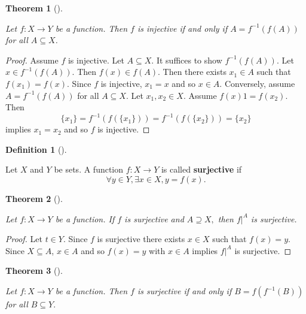 \documentclass[
  letterpaper,
  10pt,
  reqno,
  twopage,
  openany]{book}
\theoremstyle{plain}
\theoremstyle{definition}
\theoremstyle{definition}
\newtheorem{definition}{Definition}[chapter]
\theoremstyle{definition}
\theoremstyle{plain}
\theoremstyle{plain}
\newtheorem{theorem}{Theorem}[chapter]
\theoremstyle{remark}
\begin{document}
\leavevmode{}%
\begin{theorem}[]\label{thm-injective-preimage}

Let \(f:X\to Y\) be a function. Then \(f\) is injective if and only if
\(A=f^{-1}(f(A))\) for all \(A\subseteq X\).

\end{theorem}

\begin{proof}

Assume \(f\) is injective. Let \(A\subseteq X\). It suffices to show
\(f^{-1}(f(A))\). Let \(x\in f^{-1}(f(A))\). Then \(f(x)\in f(A)\). Then
there exists \(x_1\in A\) such that \(f(x_1)=f(x)\). Since \(f\) is
injective, \(x_1=x\) and so \(x\in A\). Conversely, assume
\(A=f^{-1}(f(A))\) for all \(A\subseteq X\). Let \(x_1, x_2\in X\).
Assume \(f(x)1=f(x_2)\). Then \[
\{x_1\}=f^{-1}(f(\{x_1\}))=f^{-1}(f(\{x_2\}))=\{x_2\}
\] implies \(x_1=x_2\) and so \(f\) is injective.

\end{proof}

\leavevmode{}%
\begin{definition}[]\label{def-surjective-functions}

Let \(X\) and \(Y\) be sets. A function \(f:X\to Y\) is called
 \textbf{surjective} if \[
\forall y\in Y, \exists x\in X, y=f(x).
\]

\end{definition}

\leavevmode{}%
\begin{theorem}[]\label{thm-surjective-supseteq}

Let \(f:X\to Y\) be a function. If \(f\) is surjective and
\(A\supseteq X,\) then \(f|^A\) is surjective.

\end{theorem}

\begin{proof}

Let \(t\in Y\). Since \(f\) is surjective there exists \(x\in X\) such
that \(f(x)=y\). Since \(X\subseteq A\), \(x\in A\) and so \(f(x)=y\)
with \(x\in A\) implies \(f|^A\) is surjective.

\end{proof}

\leavevmode{}%
\begin{theorem}[]\label{thm-surjective-if-and-only-if}

Let \(f:X\to Y\) be a function. Then \(f\) is surjective if and only if
\(B=f(f^{-1}(B))\) for all \(B\subseteq Y.\)

\end{theorem}
\end{document}
